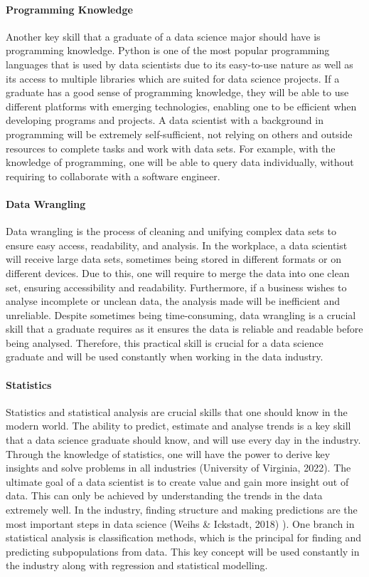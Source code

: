 \documentclass[a4paper, 11pt]{report}
\begin{document}
\paragraph{Programming Knowledge} Another key skill that a graduate of a data science major should have is programming knowledge. Python is one of the most popular programming languages that is used by data scientists due to its easy-to-use nature as well as its access to multiple libraries which are suited for data science projects. If a graduate has a good sense of programming knowledge, they will be able to use different platforms with emerging technologies, enabling one to be efficient when developing programs and projects. A data scientist with a background in programming will be extremely self-sufficient, not relying on others and outside resources to complete tasks and work with data sets. For example, with the knowledge of programming, one will be able to query data individually, without requiring to collaborate with a software engineer. 

\paragraph{Data Wrangling} Data wrangling is the process of cleaning and unifying complex data sets to ensure easy access, readability, and analysis. In the workplace, a data scientist will receive large data sets, sometimes being stored in different formats or on different devices. Due to this, one will require to merge the data into one clean set, ensuring accessibility and readability. Furthermore, if a business wishes to analyse incomplete or unclean data, the analysis made will be inefficient and unreliable. Despite sometimes being time-consuming, data wrangling is a crucial skill that a graduate requires as it ensures the data is reliable and readable before being analysed. Therefore, this practical skill is crucial for a data science graduate and will be used constantly when working in the data industry. 

\paragraph {Statistics} Statistics and statistical analysis are crucial skills that one should know in the modern world. The ability to predict, estimate and analyse trends is a key skill that a data science graduate should know, and will use every day in the industry. Through the knowledge of statistics, one will have the power to derive key insights and solve problems in all industries (University of Virginia, 2022). The ultimate goal of a data scientist is to create value and gain more insight out of data. This can only be achieved by understanding the trends in the data extremely well. In the industry, finding structure and making predictions are the most important steps in data science (Weihs & Ickstadt, 2018)
). One branch in statistical analysis  is classification methods, which is the principal for finding and predicting subpopulations from data. This key concept will be used constantly in the industry along with regression and statistical modelling. 
\end{document}
